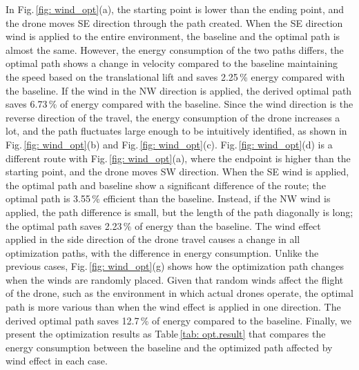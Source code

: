 \documentclass[journal]{./template/IEEEtran}
\begin{document}
In Fig.\,\ref{fig: wind_opt}(a), the starting point is lower than the ending point, and the drone moves SE direction through the path created. 
When the SE direction wind is applied to the entire environment, the baseline and the optimal path is almost the same.
However, the energy consumption of the two paths differs, the optimal path shows a change in velocity compared to the baseline maintaining the speed based on the translational lift and saves 2.25\,\% energy compared with the baseline.
If the wind in the NW direction is applied, the derived optimal path saves 6.73\,\% of energy compared with the baseline.
Since the wind direction is the reverse direction of the travel, the energy consumption of the drone increases a lot, and the path fluctuates large enough to be intuitively identified, as shown in Fig.\,\ref{fig: wind_opt}(b) and Fig.\,\ref{fig: wind_opt}(c).  
Fig.\,\ref{fig: wind_opt}(d) is a different route with Fig.\,\ref{fig: wind_opt}(a), where the endpoint is higher than the starting point, and the drone moves SW direction.
When the SE wind is applied, the optimal path and baseline show a significant difference of the route; the optimal path is 3.55\,\% efficient than the baseline.
Instead, if the NW wind is applied, the path difference is small, but the length of the path diagonally is long; the optimal path saves 2.23\,\% of energy than the baseline.
The wind effect applied in the side direction of the drone travel causes a change in all optimization paths, with the difference in energy consumption.
Unlike the previous cases, Fig.\,\ref{fig: wind_opt}(g) shows how the optimization path changes when the winds are randomly placed.
Given that random winds affect the flight of the drone, such as the environment in which actual drones operate, the optimal path is more various than when the wind effect is applied in one direction.
The derived optimal path saves 12.7\,\% of energy compared to the baseline. 
Finally, we present the optimization results as Table\,\ref{tab: opt.result} that compares the energy consumption between the baseline and the optimized path affected by wind effect in each case.
\end{document}
